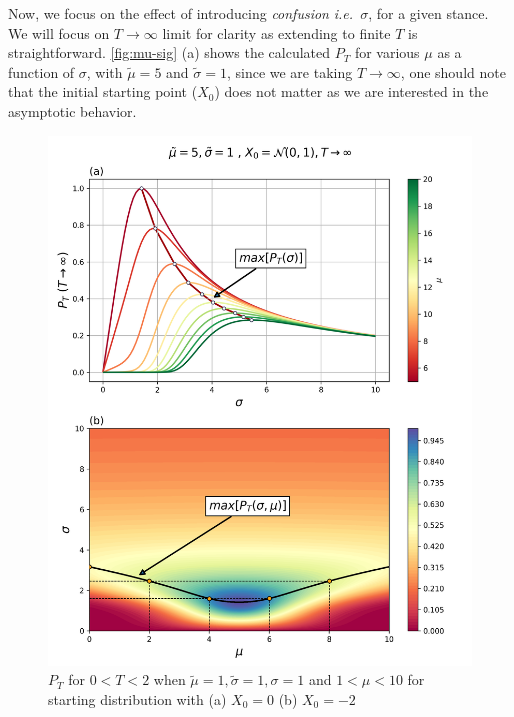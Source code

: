 \documentclass[aps,prl,twocolumn,showpacs,final]{revtex4-2}
\newcommand{\ie}{\textit{i.e.\ }}
\begin{document}
Now, we focus on the effect of introducing \textit{confusion} \ie $\sigma$, for a given stance. We will focus on $T\rightarrow\infty$ limit for clarity as extending to finite $T$ is straightforward. \autoref{fig:mu-sig} (a) shows the calculated $P_T$ for various $\mu$ as a function of $\sigma$, with $\tilde{\mu}=5$ and $\tilde{\sigma}=1$, since we are taking $T\rightarrow\infty$, one should note that the initial starting point ($X_0$) does not matter as we are interested in the asymptotic behavior.
\begin{figure}[htbp]
\includegraphics[width=\columnwidth]{figs/mu-sig.png}
\caption{ $P_T$ for $0<T<2$ when $\tilde{\mu}=1,\tilde{\sigma}=1,\sigma=1$ and $1<\mu<10$ for starting distribution with (a) $X_0=0$ (b) $X_0=-2$ }
\label{fig:mu-sig}
\end{figure}
\end{document}
